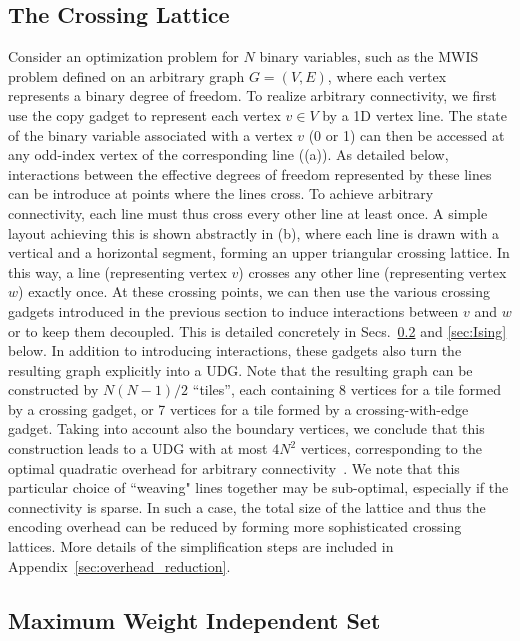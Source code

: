 \subsection{The Crossing Lattice}
\label{sec:crossing_lattice}
Consider an optimization problem for $N$ binary variables, such as the MWIS problem defined on an arbitrary graph $G = (V, E)$, where each vertex represents a binary degree of freedom.
To realize arbitrary connectivity, we first use the copy gadget to represent each vertex $v \in V$ by a 1D vertex line. The state of the binary variable associated with a vertex $v$ (0 or 1) can then be accessed at any odd-index vertex of the corresponding line ((a)). As detailed below, interactions between the effective degrees of freedom represented by these lines can be introduce at points where the lines cross. To achieve arbitrary connectivity, each line must thus cross every other line at least once. A simple layout achieving this is shown abstractly in (b), where each line is drawn with a vertical and a horizontal segment, forming an upper triangular crossing lattice. In this way, a line (representing vertex $v$) crosses any other line (representing vertex $w$) exactly once. At these crossing points, we can then use the various crossing gadgets introduced in the previous section to induce interactions between $v$ and $w$ or to keep them decoupled. This is detailed concretely in Secs.~\ref{sec:MWIS_section} and \ref{sec:Ising} below. In addition to introducing interactions, these gadgets also turn the resulting graph explicitly into a UDG. 
Note that the resulting graph can be constructed by $N(N-1)/2$ ``tiles'', each containing 8 vertices for a tile formed by a crossing gadget, or 7 vertices for a tile formed by a crossing-with-edge gadget. Taking into account also the boundary vertices, we conclude that this construction leads to a UDG with at most $4N^2$ vertices, corresponding to the optimal quadratic overhead for arbitrary connectivity~\cite{unweightedpaper}.
We note that this particular choice of ``weaving" lines together may be sub-optimal, especially if the connectivity is sparse. In such a case, the total size of the lattice and thus the encoding overhead can be reduced by forming more sophisticated crossing lattices. More details of the simplification steps are included in Appendix~\ref{sec:overhead_reduction}.

\subsection{Maximum Weight Independent Set}
\label{sec:MWIS_section}

